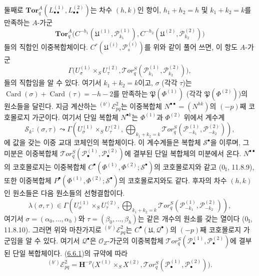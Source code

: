 \begin{env}[6.6.4]
둘째로
$\mathbf{Tor}_q^A(L_{\bullet\bullet}^{(1)},L_{\bullet\bullet}^{(2)})$는
차수 $(h,k)$인 항이, $h_1+h_2=h$ 및 $k_1+k_2=k$를 만족하는
$A$-가군
\[
  \mathbf{Tor}_q^A
  \bigl(C^{-h_1}(\mathfrak U^{(1)},\mathscr P_{k_1}^{(1)}),
        C^{-h_2}(\mathfrak U^{(2)},\mathscr P_{k_2}^{(2)})\bigr)
\]
들의 직합인 이중복합체이다.
$C^r(\mathfrak U^{(i)},\mathscr P_s^{(i)})$를 위와 같이 풀어 쓰면,
이 항도 $A$-가군
\[
  \Gamma\bigl(U_\sigma^{(1)}\times_S U_\tau^{(2)},
    \mathscr{T}\!or_q^S
    (\mathscr P_{k_1}^{(1)},\mathscr P_{k_2}^{(2)})\bigr),
\]
들의 직합임을 알 수 있다. 여기서 $k_1+k_2=k$이고,
$\sigma$ (각각 $\tau$)는
$\operatorname{Card}(\sigma)+\operatorname{Card}(\tau)=-h-2$를
만족하는 $\mathfrak P(\Phi^{(1)})$ (각각
$\mathfrak P(\Phi^{(2)})$)의 원소들을 달린다.
지금 계산하는 ${}^{(b')}\mathscr E_{pq}^2$는 이중복합체
$N^{\bullet\bullet}=(N^{hk})$의 $(-p)$째 코호몰로지 가군이다.
여기서 단일 복합체 $N^{\bullet k}$는 $\Phi^{(1)}$과
$\Phi^{(2)}$ 위에서 계수계
\[
  \mathscr S_k:(\sigma,\tau)\leadsto
  \Gamma\left(U_\sigma^{(1)}\times_S U_\tau^{(2)},
    \bigoplus_{k_1+k_2=k}
    \mathscr{T}\!or_q^S
    (\mathscr P_{-k_1}^{(1)},\mathscr P_{-k_2}^{(2)})\right),
\]
에 값을 갖는 이중 교대 코체인의 복합체이다. 이 계수계들은 복합체
$\mathscr S^\bullet$을 이루며, 그 미분은 이중복합체
$\mathscr{T}\!or_q^S
(\mathscr P_\bullet^{(1)},\mathscr P_\bullet^{(2)})$에 결부된 단일
복합체의 미분에서 온다. $N^{\bullet\bullet}$의 코호몰로지는
이중복합체
$C^\bullet(\Phi^{(1)},\Phi^{(2)};\mathscr S^\bullet)$의 코호몰로지와
같고 ($0_{\mathrm I}$, 11.8.9), 또한 이중복합체
$P^\bullet(\Phi^{(1)},\Phi^{(2)};\mathscr S^\bullet)$의 코호몰로지와도
같다. 후자의 차수 $(h,k)$인 원소들은 다음 원소들의 선형결합이다.
\[
  \lambda(\sigma,\tau)\in
  \Gamma\left(U_\sigma^{(1)}\times_S U_\tau^{(2)},
    \bigoplus_{k_1+k_2=k}
    \mathscr{T}\!or_q^S
    (\mathscr P_{-k_1}^{(1)},\mathscr P_{-k_2}^{(2)})\right),
\]
여기서 $\sigma=(\alpha_0,\ldots,\alpha_h)$와
$\tau=(\beta_0,\ldots,\beta_h)$는 같은 개수의 원소를 갖는 열이다
($0_{\mathrm I}$, 11.8.10). 그러면 위와 마찬가지로
${}^{(b')}\mathscr E_{pq}^2$는
$C^\bullet(\mathfrak U,\mathscr Q^\bullet)$의 $(-p)$째 코호몰로지
가군임을 알 수 있다. 여기서 $\mathscr Q^\bullet$은
$\mathscr O_Z$-가군의 이중복합체
$\mathscr{T}\!or_q^S
(\mathscr P_\bullet^{(1)},\mathscr P_\bullet^{(2)})$에 결부된 단일
복합체이다. (\hyperref[III.6.6.1-fr]{6.6.1})의 규약에 따라
\[
  {}^{(b')}\mathscr E_{pq}^2
  =\mathbf H^{-p}\bigl(X^{(1)}\times_S X^{(2)},
    \mathscr{T}\!or_q^S
    (\mathscr P_\bullet^{(1)},\mathscr P_\bullet^{(2)})\bigr).
\]
\end{env}

